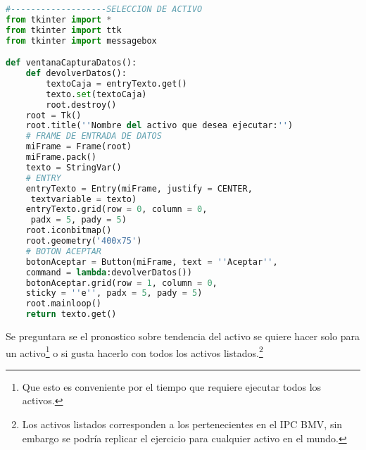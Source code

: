 \documentclass[letterpaper,12pt,oneside]{book}
\begin{document}
\begin{lstlisting}[language=Python]
#-------------------SELECCION DE ACTIVO
from tkinter import *
from tkinter import ttk
from tkinter import messagebox

def ventanaCapturaDatos():
    def devolverDatos():
        textoCaja = entryTexto.get()
        texto.set(textoCaja)
        root.destroy()
    root = Tk()
    root.title(''Nombre del activo que desea ejecutar:'')
    # FRAME DE ENTRADA DE DATOS
    miFrame = Frame(root)
    miFrame.pack()
    texto = StringVar()
    # ENTRY 
    entryTexto = Entry(miFrame, justify = CENTER,
     textvariable = texto)
    entryTexto.grid(row = 0, column = 0,
     padx = 5, pady = 5)
    root.iconbitmap()         
    root.geometry('400x75')
    # BOTON ACEPTAR
    botonAceptar = Button(miFrame, text = ''Aceptar'', 
    command = lambda:devolverDatos())
    botonAceptar.grid(row = 1, column = 0, 
    sticky = ''e'', padx = 5, pady = 5)
    root.mainloop()
    return texto.get()
\end{lstlisting}

Se preguntara se el pronostico sobre tendencia del activo se quiere hacer solo para un activo\footnote{Que esto es conveniente por el tiempo que requiere ejecutar todos los activos.} o si gusta hacerlo con todos los activos listados.\footnote{Los activos listados corresponden a los pertenecientes en el IPC BMV, sin embargo se podría replicar el ejercicio para cualquier activo en el mundo. }
\end{document}
